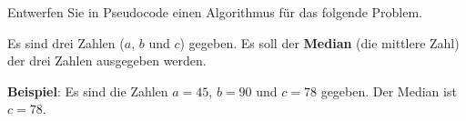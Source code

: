 %
%
Entwerfen Sie in Pseudocode einen Algorithmus für das folgende Problem.

\begin{problem}\label{problem-median-3-zahlen}
Es sind drei Zahlen ($a$, $b$ und $c$) gegeben. Es soll der \textbf{Median} (die mittlere Zahl) der drei Zahlen ausgegeben werden.
\end{problem}

\textbf{Beispiel}: Es sind die Zahlen $a = 45$, $b = 90$ und $c = 78$ gegeben. Der Median ist $c = 78$.

